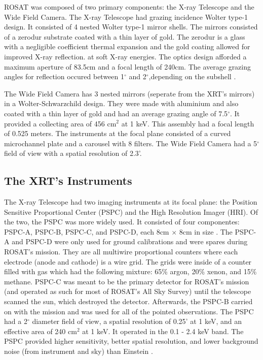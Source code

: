 ROSAT was composed of two primary components: the X-ray Telescope and the Wide Field Camera. The X-ray Telescope had grazing incidence Wolter type-1 design. 
It consisted of 4 nested Wolter type-1 mirror shells.
The mirrors consisted of a zerodur substrate coated with a thin layer of gold.
The zerodur is a glass with a negligible coefficient thermal expansion and the gold coating allowed for improved X-ray reflection. at soft X-ray energies.
The optics design afforded a maximum aperture of 83.5cm and a focal length of 240cm. 
The average grazing angles for reflection occured between 1$^{\circ}$ and 2$^{\circ}$,depending on the subshell \citep{Briel1996}.

The Wide Field Camera has 3 nested mirrors (seperate from the XRT’s mirrors) in a Wolter-Schwarzchild design. 
They were made with aluminium and also coated with a thin layer of gold and had an average grazing angle of 7.5$^{\circ}$.
It provided a collecting area of 456 cm$^2$ at 1 keV. 
This assembly had a focal length of 0.525 meters. 
The instruments at the focal plane consisted of a curved microchannel plate and a carousel with 8 filters. 
The Wide Field Camera had a 5$^{\circ}$ field of view with a spatial resolution of 2.3'.


\subsection{The XRT's Instruments}

The X-ray Telescope had two imaging instruments at its focal plane: the Position Sensitive Proportional Center (PSPC) and the High Resolution Imager (HRI). 
Of the two, the PSPC was more widely used. It consisted of four componentes: PSPC-A, PSPC-B, PSPC-C, and PSPC-D, each 8cm $\times$ 8cm in size \citep{Truemper1982}. The PSPC-A and PSPC-D were only used for ground calibrations and were spares during ROSAT's mission.
They are all multiwire proportional counters where each electrode (anode and cathode) is a wire grid. 
The grids were inside of a counter filled with gas which had the following mixture: 65\% argon, 20\% xenon, and 15\% methane.
PSPC-C was meant to be the primary detector for ROSAT’s mission (and operated as such for most of ROSAT’s All Sky Survey) until the telescope scanned the sun, which destroyed the detector. 
Afterwards, the PSPC-B carried on with the mission and was used for all of the pointed observations. 
The PSPC had a 2$^{\circ}$ diameter field of view,  a spatial resolution of 0.25’ at 1 keV, and an effective area of 240 cm$^2$ at 1 keV. 
It operated in the 0.1 - 2.4 keV band.
The PSPC provided higher sensitivity, better spatial resolution, and lower background noise (from instrument and sky) than Einstein \citep{Belloni1994} .

